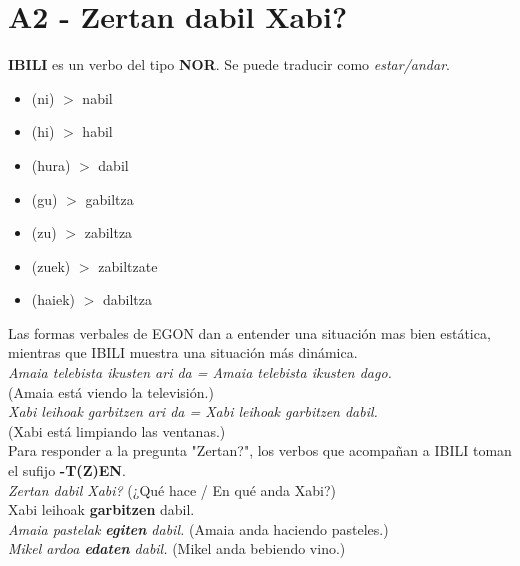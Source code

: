 \documentclass[11pt, a4paper]{article}
\begin{document}
\section{A2 - Zertan dabil Xabi?}
\noindent \textbf{IBILI} es un verbo del tipo \textbf{NOR}. Se puede traducir como \textit{estar/andar}.
\begin{multicols}{2}
\begin{itemize}
\item (ni) $>$ nabil
\item (hi) $>$ habil
\item (hura) $>$ dabil\\
\item (gu) $>$ gabiltza
\item (zu) $>$ zabiltza
\item (zuek) $>$ zabiltzate
\item (haiek) $>$ dabiltza
\end{itemize}
\end{multicols}
\noindent Las formas verbales de EGON dan a entender una situaci\'on mas bien est\'atica, mientras que IBILI muestra una situaci\'on m\'as din\'amica.\\

\indent \textit{Amaia telebista ikusten ari da = Amaia telebista ikusten dago.}\\
\indent (Amaia está viendo la televisión.)\\
\indent \textit{Xabi leihoak garbitzen ari da = Xabi leihoak garbitzen dabil.}\\
\indent (Xabi está limpiando las ventanas.)\\

\noindent Para responder a la pregunta "Zertan?", los verbos que acompañan a IBILI toman el sufijo \textbf{-T(Z)EN}.\\
\indent \textit{Zertan dabil Xabi?} (¿Qué hace / En qué anda Xabi?)\\
\indent Xabi leihoak \textbf{garbitzen} dabil.\\
\indent \textit{Amaia pastelak \textbf{egiten} dabil.} (Amaia anda haciendo pasteles.)\\
\indent \textit{Mikel ardoa \textbf{edaten} dabil.} (Mikel anda bebiendo vino.)\\ \\
\end{document}
